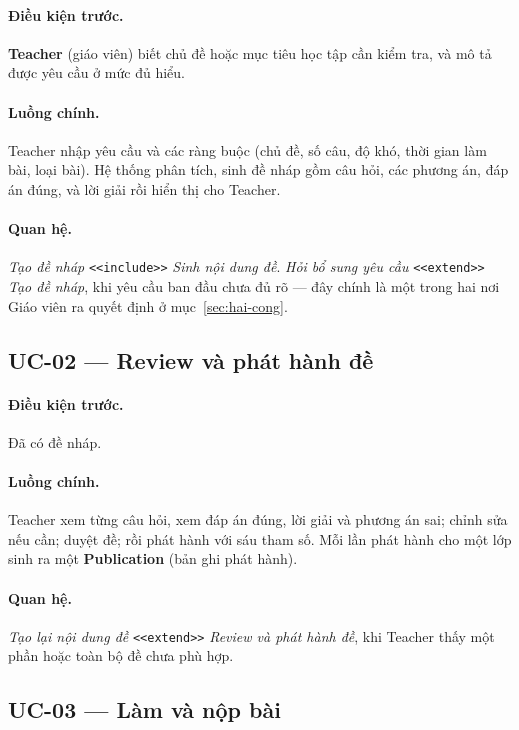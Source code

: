 \paragraph{Điều kiện trước.} \textbf{Teacher} (giáo viên) biết chủ đề hoặc mục tiêu học tập cần
kiểm tra, và mô tả được yêu cầu ở mức đủ hiểu.

\paragraph{Luồng chính.} Teacher nhập yêu cầu và các ràng buộc (chủ đề, số câu, độ khó, thời gian
làm bài, loại bài). Hệ thống phân tích, sinh đề nháp gồm câu hỏi, các phương án, đáp án đúng, và lời giải
rồi hiển thị cho Teacher.

\paragraph{Quan hệ.} \emph{Tạo đề nháp} \texttt{<<include>>} \emph{Sinh nội dung đề}. \emph{Hỏi bổ
sung yêu cầu} \texttt{<<extend>>} \emph{Tạo đề nháp}, khi yêu cầu ban đầu chưa đủ rõ --- đây chính
là một trong hai nơi Giáo viên ra quyết định ở mục~\ref{sec:hai-cong}.

\subsection{UC-02 --- Review và phát hành đề}

\paragraph{Điều kiện trước.} Đã có đề nháp.

\paragraph{Luồng chính.} Teacher xem từng câu hỏi, xem đáp án đúng, lời giải và phương án sai;
chỉnh sửa nếu cần; duyệt đề; rồi phát hành với sáu tham số. Mỗi lần phát hành cho một lớp
sinh ra một \textbf{Publication} (bản ghi phát hành).

\paragraph{Quan hệ.} \emph{Tạo lại nội dung đề} \texttt{<<extend>>} \emph{Review và phát hành đề},
khi Teacher thấy một phần hoặc toàn bộ đề chưa phù hợp.

\subsection{UC-03 --- Làm và nộp bài}

